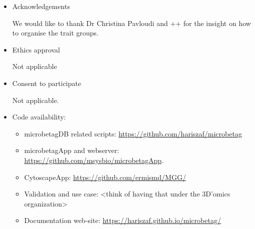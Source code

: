 \documentclass[sn-mathphys,Numbered]{sn-jnl}%
\theoremstyle{thmstyleone}%
\theoremstyle{thmstyletwo}%
\theoremstyle{thmstylethree}%
\begin{document}
\begin{itemize}
        \item Acknowledgements

            We would like to thank Dr Christina Pavloudi and ++ for the insight on how to organise the trait groups.


        \item Ethics approval 

            Not applicable

        \item Consent to participate
        
            Not applicable.

        \item Code availability: 
        \begin{itemize}
            \item microbetagDB related scripts: \href{https://github.com/hariszaf/microbetag}{https://github.com/hariszaf/microbetag}
            \item microbetagApp and webserver: \href{https://github.com/msysbio/microbetagApp}{https://github.com/msysbio/microbetagApp}.
            \item CytoscapeApp: \href{https://github.com/ermismd/MGG/}{https://github.com/ermismd/MGG/}
            \item Validation and use case: <think of having that under the 3D'omics organization> 
            \item Documentation web-site: \href{https://hariszaf.github.io/microbetag/}{https://hariszaf.github.io/microbetag/}
        \end{itemize}

        

    \end{itemize}
\end{document}

